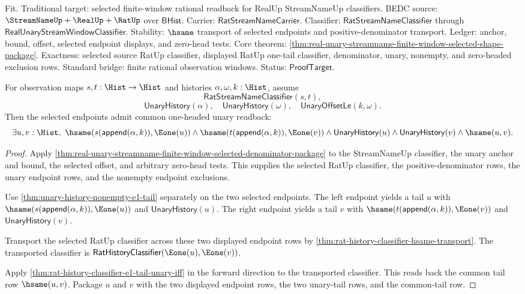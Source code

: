Fit. Traditional target: selected finite-window rational readback for RealUp
StreamNameUp classifiers. BEDC source: $\StreamNameUp+\RealUp+\RatUp$ over
$\mathsf{BHist}$. Carrier: $\mathsf{RatStreamNameCarrier}$. Classifier:
$\mathsf{RatStreamNameClassifier}$ through
$\mathsf{RealUnaryStreamWindowClassifier}$. Stability: $\hsame$ transport of
selected endpoints and positive-denominator transport. Ledger: anchor, bound,
offset, selected endpoint displays, and zero-head tests. Core theorem:
\autoref{thm:real-unary-streamname-finite-window-selected-shape-package}.
Exactness: selected source RatUp classifier, displayed RatUp one-tail classifier,
denominator, unary, nonempty, and zero-headed exclusion rows. Standard bridge:
finite rational observation windows. Status: $\mathsf{ProofTarget}$.

\begin{theorem}
\label{thm:real-unary-streamname-finite-window-selected-common-e1-tail-readback}
For observation maps $s,t:\Hist\to\Hist$ and histories
$\alpha,\omega,k:\Hist$, assume
$$
\mathsf{RatStreamNameClassifier}(s,t),
$$
$$
\mathsf{UnaryHistory}(\alpha),\quad
\mathsf{UnaryHistory}(\omega),\quad
\mathsf{UnaryOffsetLe}(k,\omega).
$$
Then the selected endpoints admit common one-headed unary readback:
$$
\exists u,v:\Hist,\
\hsame(s(\mathsf{append}(\alpha,k)),\Eone(u))\land
\hsame(t(\mathsf{append}(\alpha,k)),\Eone(v))\land
\mathsf{UnaryHistory}(u)\land
\mathsf{UnaryHistory}(v)\land
\hsame(u,v).
$$
\end{theorem}
\begin{proof}
Apply
\autoref{thm:real-unary-streamname-finite-window-selected-denominator-package}
to the StreamNameUp classifier, the unary anchor and bound, the selected
offset, and arbitrary zero-head tests. This supplies the selected RatUp
classifier, the positive-denominator rows, the unary endpoint rows, and the
nonempty endpoint exclusions.

Use \autoref{thm:unary-history-nonempty-e1-tail} separately on the two selected
endpoints. The left endpoint yields a tail $u$ with
$\hsame(s(\mathsf{append}(\alpha,k)),\Eone(u))$ and
$\mathsf{UnaryHistory}(u)$. The right endpoint yields a tail $v$ with
$\hsame(t(\mathsf{append}(\alpha,k)),\Eone(v))$ and
$\mathsf{UnaryHistory}(v)$.

Transport the selected RatUp classifier across these two displayed endpoint
rows by \autoref{thm:rat-history-classifier-hsame-transport}. The transported
classifier is $\mathsf{RatHistoryClassifier}(\Eone(u),\Eone(v))$.

Apply \autoref{thm:rat-history-classifier-e1-tail-unary-iff} in the forward
direction to the transported classifier. This reads back the common tail row
$\hsame(u,v)$. Package $u$ and $v$ with the two displayed endpoint rows, the
two unary-tail rows, and the common-tail row.
\end{proof}

